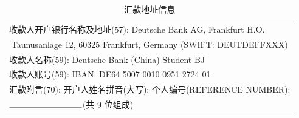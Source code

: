 \documentclass{article}
\begin{document}

\begin{table}
\caption{汇款地址信息}
\label{tb:address}
\begin{center}
\begin{tabular}{l}
\toprule
收款人开户银行名称及地址(57): Deutsche Bank AG, Frankfurt H.O. \\
\multicolumn{1}{c}{Taunusanlage 12, 60325 Frankfurt, Germany
 (SWIFT: DEUTDEFFXXX)} \\
收款人名称(59): Deutsche Bank (China) Student BJ \\
收款人账号(59): IBAN: DE64 5007 0010 0951 2724 01 \\
汇款附言(70): 开户人姓名拼音(大写): \underline{\hspace*{3cm}} 个人编号(REFERENCE NUMBER):\\
 $\rule{3cm}{0.15mm}$(共 9 位组成) \\ \bottomrule
\end{tabular}
\end{center}
\end{table}

\newpage
\end{document}
